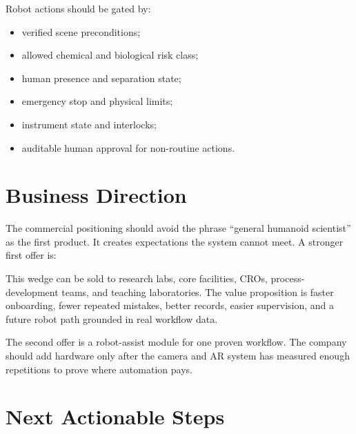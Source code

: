 \documentclass[11pt]{article}
\begin{document}
Robot actions should be gated by:

\begin{itemize}
  \item verified scene preconditions;
  \item allowed chemical and biological risk class;
  \item human presence and separation state;
  \item emergency stop and physical limits;
  \item instrument state and interlocks;
  \item auditable human approval for non-routine actions.
\end{itemize}

\section{Business Direction}

The commercial positioning should avoid the phrase ``general humanoid scientist'' as the first product. It creates expectations the system cannot meet. A stronger first offer is:

\begin{center}
\end{center}

This wedge can be sold to research labs, core facilities, CROs, process-development teams, and teaching laboratories. The value proposition is faster onboarding, fewer repeated mistakes, better records, easier supervision, and a future robot path grounded in real workflow data.

The second offer is a robot-assist module for one proven workflow. The company should add hardware only after the camera and AR system has measured enough repetitions to prove where automation pays.

\section{Next Actionable Steps}
\end{document}
